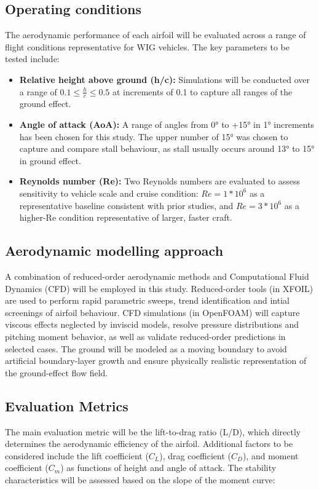 \subsection{Operating conditions}

The aerodynamic performance of each airfoil will be evaluated across a range of flight conditions representative for WIG vehicles. The key parameters to be tested include: 
\begin{itemize}
    \item \textbf{Relative height above ground (h/c):} Simulations will be conducted over a range of $0.1 \leq \frac{h}{c} \leq 0.5$ at increments of 0.1 to capture all ranges of the ground effect.
    \item \textbf{Angle of attack (AoA):} A range of angles from 0° to +15° in 1° increments has been chosen for this study. The upper number of 15° was chosen to capture and compare stall behaviour, as stall usually occurs around 13° to 15° in ground effect.
    \item \textbf{Reynolds number (Re):} Two Reynolds numbers are evaluated to assess sensitivity to vehicle scale and cruise condition: $Re=1*10^6$ as a representative baseline consistent with prior studies, and $Re=3*10^6$ as a higher-Re condition representative of larger, faster craft.
\end{itemize}

\subsection{Aerodynamic modelling approach}

A combination of reduced-order aerodynamic methods and Computational Fluid Dynamics (CFD) will be employed in this study. Reduced-order tools (in XFOIL) are used to perform rapid parametric sweeps, trend identification and intial screenings of airfoil behaviour. CFD simulations (in OpenFOAM) will capture viscous effects neglected by inviscid models, resolve pressure distributions and pitching moment behavior, as well as validate reduced-order predictions in selected cases. The ground will be modeled as a moving boundary to avoid artificial boundary-layer growth and ensure physically realistic representation of the ground-effect flow field.

\subsection{Evaluation Metrics}

The main evaluation metric will be the lift-to-drag ratio (L/D), which directly determines the aerodynamic efficiency of the airfoil. Additional factors to be considered include the lift coefficient ($C_L$), drag coefficient ($C_D$), and moment coefficient ($C_m$) as functions of height and angle of attack. The stability characteristics will be assessed based on the slope of the moment curve:

